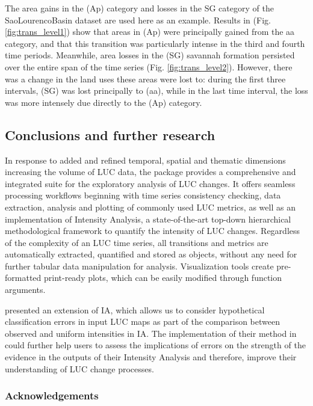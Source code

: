 The area gains in the (Ap) category and losses in the SG category of the
SaoLourencoBasin dataset are used here as an example. Results in (Fig.
\ref{fig:trans_level1}) show that areas in (Ap) were principally gained
from the aa category, and that this transition was particularly intense
in the third and fourth time periods. Meanwhile, area losses in the (SG)
savannah formation persisted over the entire span of the time series
(Fig. \ref{fig:trans_level2}). However, there was a change in the land
uses these areas were lost to: during the first three intervals, (SG) was
lost principally to (aa), while in the last time interval, the loss was
more intensely due directly to the (Ap) category.

\hypertarget{conclusions-and-further-research}{%
\subsection{Conclusions and further
research}\label{conclusions-and-further-research}}

In response to added and refined temporal, spatial and thematic
dimensions increasing the volume of LUC data, the  package
provides a comprehensive and integrated suite for the exploratory
analysis of LUC changes. It offers seamless processing workflows
beginning with time series consistency checking, data extraction,
analysis and plotting of commonly used LUC metrics, as well as an
implementation of Intensity Analysis, a state-of-the-art top-down
hierarchical methodological framework to quantify the intensity of LUC
changes. Regardless of the complexity of an LUC time series, all
transitions and metrics are automatically extracted, quantified and
stored as objects, without any need for further tabular data
manipulation for analysis. Visualization tools create pre-formatted
print-ready plots, which can be easily modified through function
arguments.

\citet{Aldwaik2013} presented an extension of IA, which allows us to
consider hypothetical classification errors in input LUC maps as part of
the comparison between observed and uniform intensities in IA. The
implementation of their method in  could further help users to
assess the implications of errors on the strength of the evidence in the
outputs of their Intensity Analysis and therefore, improve their
understanding of LUC change processes.

\hypertarget{acknowledgements}{%
\subsubsection{Acknowledgements}\label{acknowledgements}}

